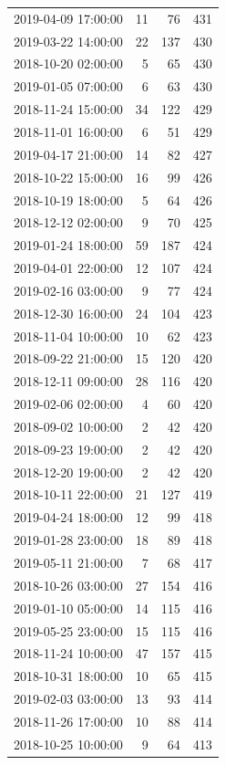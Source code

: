 \begin{tabular}{lrrr}
2019-04-09 17:00:00 & 11 & 76 & 431 \\
2019-03-22 14:00:00 & 22 & 137 & 430 \\
2018-10-20 02:00:00 & 5 & 65 & 430 \\
2019-01-05 07:00:00 & 6 & 63 & 430 \\
2018-11-24 15:00:00 & 34 & 122 & 429 \\
2018-11-01 16:00:00 & 6 & 51 & 429 \\
2019-04-17 21:00:00 & 14 & 82 & 427 \\
2018-10-22 15:00:00 & 16 & 99 & 426 \\
2018-10-19 18:00:00 & 5 & 64 & 426 \\
2018-12-12 02:00:00 & 9 & 70 & 425 \\
2019-01-24 18:00:00 & 59 & 187 & 424 \\
2019-04-01 22:00:00 & 12 & 107 & 424 \\
2019-02-16 03:00:00 & 9 & 77 & 424 \\
2018-12-30 16:00:00 & 24 & 104 & 423 \\
2018-11-04 10:00:00 & 10 & 62 & 423 \\
2018-09-22 21:00:00 & 15 & 120 & 420 \\
2018-12-11 09:00:00 & 28 & 116 & 420 \\
2019-02-06 02:00:00 & 4 & 60 & 420 \\
2018-09-02 10:00:00 & 2 & 42 & 420 \\
2018-09-23 19:00:00 & 2 & 42 & 420 \\
2018-12-20 19:00:00 & 2 & 42 & 420 \\
2018-10-11 22:00:00 & 21 & 127 & 419 \\
2019-04-24 18:00:00 & 12 & 99 & 418 \\
2019-01-28 23:00:00 & 18 & 89 & 418 \\
2019-05-11 21:00:00 & 7 & 68 & 417 \\
2018-10-26 03:00:00 & 27 & 154 & 416 \\
2019-01-10 05:00:00 & 14 & 115 & 416 \\
2019-05-25 23:00:00 & 15 & 115 & 416 \\
2018-11-24 10:00:00 & 47 & 157 & 415 \\
2018-10-31 18:00:00 & 10 & 65 & 415 \\
2019-02-03 03:00:00 & 13 & 93 & 414 \\
2018-11-26 17:00:00 & 10 & 88 & 414 \\
2018-10-25 10:00:00 & 9 & 64 & 413 \\

\end{tabular}
